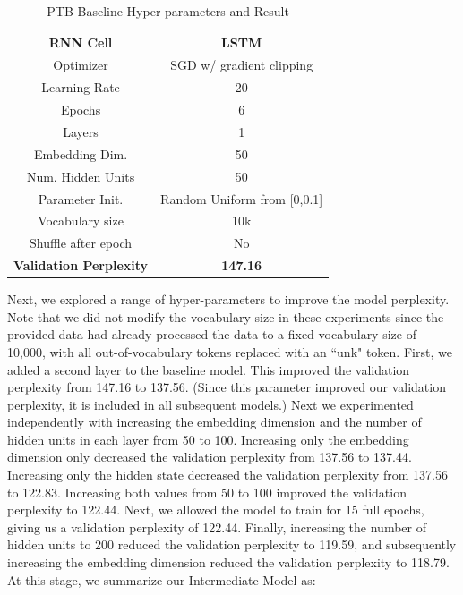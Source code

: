 \documentclass[a4paper]{article}
\begin{document}
\begin{table}[h]
\centering
\begin{tabular}{|c | c|} 
 \hline
RNN Cell & LSTM\\ \hline
Optimizer & SGD w/ gradient clipping \\ \hline
Learning Rate & 20 \\ \hline
Epochs & 6\\ \hline
Layers & 1\\ \hline
Embedding Dim. & 50\\ \hline
Num. Hidden Units & 50\\ \hline
Parameter Init. & Random Uniform from [0,0.1]\\ \hline
Vocabulary size & 10k\\ \hline
Shuffle after epoch & No \\ \hline
\textbf{Validation Perplexity} &\textbf{147.16} \\ \hline
\end{tabular}
\caption{PTB Baseline Hyper-parameters and Result}
\label{table:1}
\end{table}

Next, we explored a range of hyper-parameters to improve the model perplexity. Note that we did not modify the vocabulary size in these experiments since the provided data had already processed the data to a fixed vocabulary size of 10,000, with all out-of-vocabulary tokens replaced with an ``unk" token. 
\newline
\newline
First, we added a second layer to the baseline model. This improved the validation perplexity from 147.16 to 137.56. (Since this parameter improved our validation perplexity, it is included in all subsequent models.) Next we experimented independently with increasing the embedding dimension and the number of hidden units in each layer from 50 to 100. Increasing only the embedding dimension only decreased the validation perplexity from 137.56 to 137.44. Increasing only the hidden state decreased the validation perplexity from 137.56 to 122.83. Increasing both values from 50 to 100 improved the validation perplexity to 122.44. Next, we allowed the model to train for 15 full epochs, giving us a validation perplexity of 122.44. Finally, increasing the number of hidden units to 200 reduced the validation perplexity to 119.59, and subsequently increasing the embedding dimension reduced the validation perplexity to 118.79.
\newline
\newline
At this stage, we summarize our Intermediate Model as:
\end{document}
